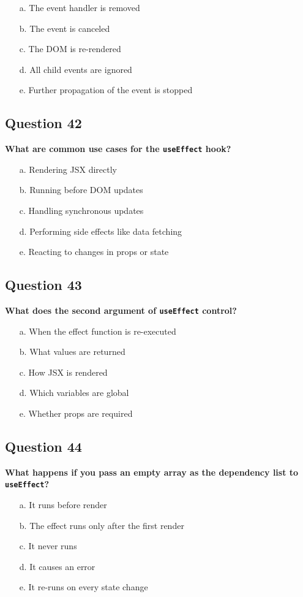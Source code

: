 \documentclass{article}
\begin{document}
\begin{itemize}
  \item[a.] The event handler is removed
  \item[b.] The event is canceled
  \item[c.] The DOM is re-rendered
  \item[d.] All child events are ignored
  \item[e.] Further propagation of the event is stopped
\end{itemize}

\subsection*{Question 42}
\textbf{What are common use cases for the \texttt{useEffect} hook?}

\begin{itemize}
  \item[a.] Rendering JSX directly
  \item[b.] Running before DOM updates
  \item[c.] Handling synchronous updates
  \item[d.] Performing side effects like data fetching
  \item[e.] Reacting to changes in props or state
\end{itemize}

\subsection*{Question 43}
\textbf{What does the second argument of \texttt{useEffect} control?}

\begin{itemize}
  \item[a.] When the effect function is re-executed
  \item[b.] What values are returned
  \item[c.] How JSX is rendered
  \item[d.] Which variables are global
  \item[e.] Whether props are required
\end{itemize}

\subsection*{Question 44}
\textbf{What happens if you pass an empty array as the dependency list to \texttt{useEffect}?}

\begin{itemize}
  \item[a.] It runs before render
  \item[b.] The effect runs only after the first render
  \item[c.] It never runs
  \item[d.] It causes an error
  \item[e.] It re-runs on every state change
\end{itemize}
\end{document}
